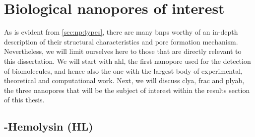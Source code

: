 %
%
\section{Biological nanopores of interest}
%
\label{sec:np:interest}


As is evident from \cref{sec:np:types}, there are many \glspl{bnp} worthy of an in-depth description of their
structural characteristics and pore formation mechanism. Nevertheless, we will limit ourselves here to those
that are directly relevant to this dissertation. We will start with \gls{ahl}, the first nanopore used for the
detection of biomolecules, and hence also the one with the largest body of experimental, theoretical and
computational work. Next, we will discuss \gls{clya}, \gls{frac} and \gls{plyab}, the three nanopores that
will be the subject of interest within the results section of this thesis.


\subsection[Alpha-Hemolysin (aHL)]{\ta-Hemolysin (\ta{}HL)}
%
\label{sec:np:ahl}
%

